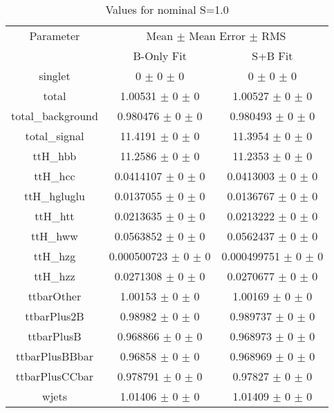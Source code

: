 \begin{table}
\centering
\caption{Values for nominal S=1.0}
\begin{tabular}{ccc}
\toprule
Parameter 	& \multicolumn{2}{c}{Mean $\pm$ Mean Error $\pm$ RMS}\\
 	& B-Only Fit & S+B Fit\\
\midrule
singlet 	& \num{0} $\pm$ \num{0} $\pm$ \num{0} 	& \num{0} $\pm$ \num{0} $\pm$ \num{0}\\
total 	& \num{1.00531} $\pm$ \num{0} $\pm$ \num{0} 	& \num{1.00527} $\pm$ \num{0} $\pm$ \num{0}\\
total\_background 	& \num{0.980476} $\pm$ \num{0} $\pm$ \num{0} 	& \num{0.980493} $\pm$ \num{0} $\pm$ \num{0}\\
total\_signal 	& \num{11.4191} $\pm$ \num{0} $\pm$ \num{0} 	& \num{11.3954} $\pm$ \num{0} $\pm$ \num{0}\\
ttH\_hbb 	& \num{11.2586} $\pm$ \num{0} $\pm$ \num{0} 	& \num{11.2353} $\pm$ \num{0} $\pm$ \num{0}\\
ttH\_hcc 	& \num{0.0414107} $\pm$ \num{0} $\pm$ \num{0} 	& \num{0.0413003} $\pm$ \num{0} $\pm$ \num{0}\\
ttH\_hgluglu 	& \num{0.0137055} $\pm$ \num{0} $\pm$ \num{0} 	& \num{0.0136767} $\pm$ \num{0} $\pm$ \num{0}\\
ttH\_htt 	& \num{0.0213635} $\pm$ \num{0} $\pm$ \num{0} 	& \num{0.0213222} $\pm$ \num{0} $\pm$ \num{0}\\
ttH\_hww 	& \num{0.0563852} $\pm$ \num{0} $\pm$ \num{0} 	& \num{0.0562437} $\pm$ \num{0} $\pm$ \num{0}\\
ttH\_hzg 	& \num{0.000500723} $\pm$ \num{0} $\pm$ \num{0} 	& \num{0.000499751} $\pm$ \num{0} $\pm$ \num{0}\\
ttH\_hzz 	& \num{0.0271308} $\pm$ \num{0} $\pm$ \num{0} 	& \num{0.0270677} $\pm$ \num{0} $\pm$ \num{0}\\
ttbarOther 	& \num{1.00153} $\pm$ \num{0} $\pm$ \num{0} 	& \num{1.00169} $\pm$ \num{0} $\pm$ \num{0}\\
ttbarPlus2B 	& \num{0.98982} $\pm$ \num{0} $\pm$ \num{0} 	& \num{0.989737} $\pm$ \num{0} $\pm$ \num{0}\\
ttbarPlusB 	& \num{0.968866} $\pm$ \num{0} $\pm$ \num{0} 	& \num{0.968973} $\pm$ \num{0} $\pm$ \num{0}\\
ttbarPlusBBbar 	& \num{0.96858} $\pm$ \num{0} $\pm$ \num{0} 	& \num{0.968969} $\pm$ \num{0} $\pm$ \num{0}\\
ttbarPlusCCbar 	& \num{0.978791} $\pm$ \num{0} $\pm$ \num{0} 	& \num{0.97827} $\pm$ \num{0} $\pm$ \num{0}\\
wjets 	& \num{1.01406} $\pm$ \num{0} $\pm$ \num{0} 	& \num{1.01409} $\pm$ \num{0} $\pm$ \num{0}\\
\bottomrule
\end{tabular}
\end{table}